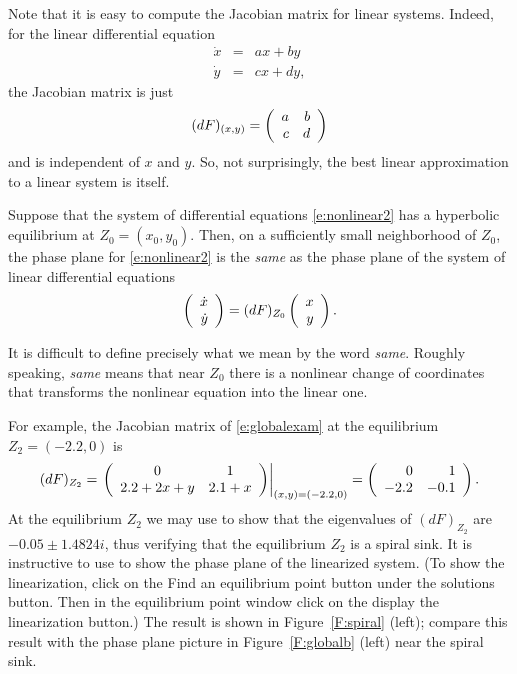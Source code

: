 \documentclass{ximera}
\begin{document}
Note that it is easy to compute the Jacobian matrix for linear 
systems.  Indeed, for the linear differential equation
\begin{eqnarray*}
\dot{x} & = & ax+by \\ \dot{y} & = & cx+dy,
\end{eqnarray*}
the Jacobian matrix is just 
\[
(dF)_{(x,y)} = \left(\begin{array}{rr} a & b\\ c &d\end{array}\right)
\]
and is independent of $x$ and $y$.  So, not surprisingly, the 
best linear approximation to a linear system is itself.

\begin{theorem} \label{T:linearization} 
Suppose that the system of differential equations
\eqref{e:nonlinear2} has a hyperbolic equilibrium at
$Z_0=(x_0,y_0)$.  Then, on a sufficiently small neighborhood of
$Z_0$, the phase plane for \eqref{e:nonlinear2} is the {\em
same\/} as the phase plane of the system of 
linear differential equations
\begin{equation}  \label{e:linearizedeqn}
\left(\begin{array}{r} \dot{x} \\ \dot{y}\end{array}\right) = (dF)_{Z_0} \left(\begin{array}{r} x \\ y\end{array}\right).
\end{equation}
\end{theorem}  
It is difficult to define precisely what we mean by the word
{\em same\/}. Roughly speaking, {\em same\/} means that near 
$Z_0$ there is a nonlinear change of coordinates that 
transforms the nonlinear equation into the linear one.

For example, the Jacobian matrix of \eqref{e:globalexam} at the
equilibrium $Z_2=(-2.2,0)$ is 
\[
(dF)_{Z_2} = \left.\left(\begin{array}{cc} 0 & 1\\ 2.2+2x+y &2.1+x\end{array}\right)\right|_{(x,y)=(-2.2,0)} 
= \left(\begin{array}{rr} 0 & 1\\ -2.2 &-0.1\end{array}\right).
\]
At the equilibrium $Z_2$ we may use \Matlab to show that the 
eigenvalues of $(dF)_{Z_2}$ are $-0.05\pm 1.4824i$, thus verifying 
that the equilibrium $Z_2$ is a spiral sink.  
It is instructive to use {\pplane} to 
show the phase plane of 
the linearized system.  
(To show the linearization, click on the 
{\sf Find an equilibrium point} button under the {\sf solutions} 
button.  Then in the {\sf \PPLANE equilibrium point} window click 
on the {\sf display the linearization} button.)  The result is
shown in Figure~\ref{F:spiral} (left); compare this result 
with the phase plane picture in Figure~\ref{F:globalb} (left) 
near the spiral sink.

\begin{figure*}[htb]
           \centerline{%
           }
           \caption{(Left) Trajectory of \protect\eqref{e:linearizedeqn} 
	     near the spiral sink $Z_2$. (Right) The time series $x$ 
		versus $t$ for this solution.}
           \label{F:spiral}
\end{figure*}
\end{document}
